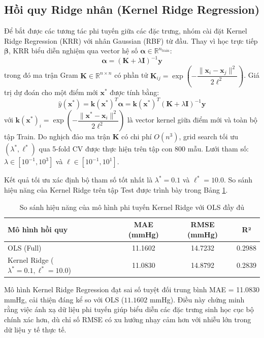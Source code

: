 \documentclass[12pt,a4paper]{article}
\begin{document}
\subsection{Hồi quy Ridge nhân (Kernel Ridge Regression)}
Để bắt được các tương tác phi tuyến giữa các đặc trưng, nhóm cài đặt Kernel Ridge Regression (KRR) với nhân Gaussian (RBF) từ đầu. Thay vì học trực tiếp $\boldsymbol{\beta}$, KRR biểu diễn nghiệm qua vector hệ số $\boldsymbol{\alpha} \in \mathbb{R}^{n_{\text{train}}}$:
\begin{equation}
\boldsymbol{\alpha} = (\mathbf{K} + \lambda \mathbf{I})^{-1} \mathbf{y}
\end{equation}
trong đó ma trận Gram $\mathbf{K} \in \mathbb{R}^{n \times n}$ có phần tử $\mathbf{K}_{ij} = \exp\!\left(-\dfrac{\|\mathbf{x}_i - \mathbf{x}_j\|^2}{2\ell^2}\right)$. Giá trị dự đoán cho một điểm mới $\mathbf{x}^*$ được tính bằng:
\begin{equation}
\hat{y}(\mathbf{x}^*) = \mathbf{k}(\mathbf{x}^*)^T \boldsymbol{\alpha} = \mathbf{k}(\mathbf{x}^*)^T (\mathbf{K} + \lambda \mathbf{I})^{-1} \mathbf{y}
\end{equation}
với $\mathbf{k}(\mathbf{x}^*)_i = \exp\!\left(-\dfrac{\|\mathbf{x}^* - \mathbf{x}_i\|^2}{2\ell^2}\right)$ là vector kernel giữa điểm mới và toàn bộ tập Train. Do nghịch đảo ma trận $\mathbf{K}$ có chi phí $O(n^3)$, grid search tối ưu $(\lambda^*, \ell^*)$ qua 5-fold CV được thực hiện trên tập con 800 mẫu. Lưới tham số: $\lambda \in [10^{-1}, 10^3]$ và $\ell \in [10^{-1}, 10^1]$.

Kết quả tối ưu xác định bộ tham số tốt nhất là $\lambda^* = 0.1$ và $\ell^* = 10.0$. So sánh hiệu năng của Kernel Ridge trên tập Test được trình bày trong Bảng \ref{tab:krr_comparison}.

\begin{table}[H]
\centering
\caption{So sánh hiệu năng của mô hình phi tuyến Kernel Ridge với OLS đầy đủ}
\label{tab:krr_comparison}
\small
\begin{tabular}{lccc}
\toprule
\textbf{Mô hình hồi quy} & \textbf{MAE (mmHg)} & \textbf{RMSE (mmHg)} & \textbf{R²} \\
\midrule
OLS (Full) & 11.1602 & 14.7232 & 0.2988 \\
Kernel Ridge ($\lambda^*=0.1, \ell^*=10.0$) & 11.0830 & 14.8792 & 0.2839 \\
\bottomrule
\end{tabular}
\end{table}

Mô hình Kernel Ridge Regression đạt sai số tuyệt đối trung bình MAE = 11.0830 mmHg, cải thiện đáng kể so với OLS ($11.1602$ mmHg). Điều này chứng minh rằng việc ánh xạ dữ liệu phi tuyến giúp biểu diễn các đặc trưng sinh học cục bộ chính xác hơn, dù chỉ số RMSE có xu hướng nhạy cảm hơn với nhiễu lớn trong dữ liệu y tế thực tế.
\end{document}
